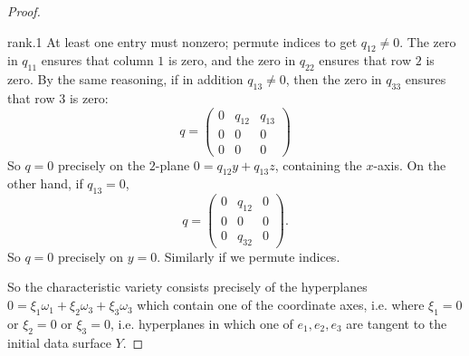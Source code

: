 \begin{proof}
\begin{answer}{rank.1}
At least one entry must nonzero; permute indices to get \(q_{12}\ne 0\).
The zero in \(q_{11}\) ensures that column \(1\) is zero, and the zero in \(q_{22}\) ensures that row \(2\) is zero.
By the same reasoning, if in addition \(q_{13}\ne 0\), then the zero in \(q_{33}\) ensures that row \(3\) is zero:
\[
q=
\begin{pmatrix}
0 & q_{12} & q_{13} \\
0 & 0 & 0 \\
0 & 0 & 0 
\end{pmatrix}
\]
So \(q=0\) precisely on the \(2\)-plane \(0=q_{12}y+q_{13}z\), containing the \(x\)-axis.
On the other hand, if \(q_{13}=0\),
\[
q=
\begin{pmatrix}
0 & q_{12} & 0 \\
0 & 0 & 0 \\
0 & q_{32} & 0 
\end{pmatrix}.
\]
So \(q=0\) precisely on \(y=0\).
Similarly if we permute indices.
\end{answer}
So the characteristic variety consists precisely of the hyperplanes \(0=\xi_1\omega_1+\xi_2\omega_3+\xi_3\omega_3\) which contain one of the coordinate axes, i.e. where \(\xi_1=0\) or \(\xi_2=0\) or \(\xi_3=0\), i.e. hyperplanes in which one of \(e_1,e_2,e_3\) are tangent to the initial data surface \(Y\).
\end{proof}


